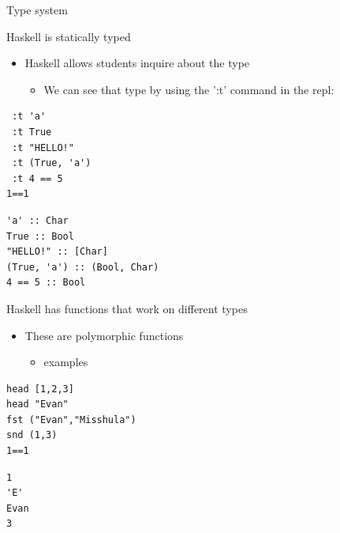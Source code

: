 \documentclass[presetation]{beamer}
\begin{document}
\begin{frame}[fragile,label={sec:org074257b}]{Type system}
 \begin{block}{Haskell is statically typed}
\begin{itemize}
\item Haskell allows students inquire about the type
\begin{itemize}
\item We can see that type by using the ':t' command in the repl:
\end{itemize}
\end{itemize}
\begin{verbatim}
 :t 'a'
 :t True
 :t "HELLO!"
 :t (True, 'a')
 :t 4 == 5
1==1
\end{verbatim}

\begin{verbatim}
'a' :: Char
True :: Bool
"HELLO!" :: [Char]
(True, 'a') :: (Bool, Char)
4 == 5 :: Bool
\end{verbatim}
\end{block}

\begin{block}{Haskell has functions that work on different types}
\pause
\begin{itemize}
\item These are polymorphic functions
\begin{itemize}
\item examples
\end{itemize}
\end{itemize}
\begin{verbatim}
head [1,2,3]
head "Evan"
fst ("Evan","Misshula")
snd (1,3)
1==1
\end{verbatim}

\begin{verbatim}
1
'E'
Evan
3
\end{verbatim}
\end{block}
\end{frame}
\end{document}
